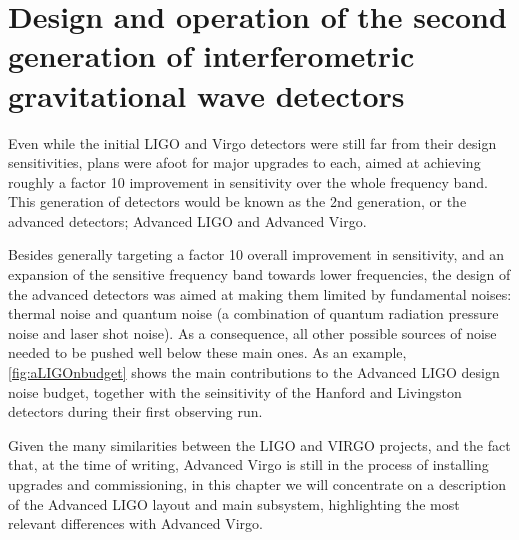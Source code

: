 \section{Design and operation of the second generation of interferometric gravitational wave detectors}\label{subsec:2ndgen}

Even while the initial LIGO and Virgo detectors were still far from their design sensitivities, plans were afoot for major upgrades to each, aimed at achieving roughly a factor 10 improvement in sensitivity over the whole frequency band. 
This generation of detectors would be known as the 2nd generation, or the advanced detectors; Advanced LIGO\cite{Aasi_2015b,aLIGOSensitivity} and Advanced Virgo\cite{aVirgoTR2012}. 

Besides generally targeting a factor 10 overall improvement in sensitivity, and an expansion of the sensitive frequency band towards lower frequencies, the design of the advanced detectors was aimed at making them limited by fundamental noises: thermal noise and quantum noise (a combination of quantum radiation pressure noise and laser shot noise).
As a consequence, all other possible sources of noise needed to be pushed well below these main ones.
As an example, \autoref{fig:aLIGOnbudget} shows the main contributions to the Advanced LIGO design noise budget, together with the seinsitivity of the Hanford and Livingston detectors during their first observing run.

Given the many similarities between the LIGO and VIRGO projects, and the fact that, at the time of writing, Advanced Virgo is still in the process of installing upgrades and commissioning, in this chapter we will concentrate on a description of the Advanced LIGO layout and main subsystem, highlighting the most relevant differences with Advanced Virgo.


